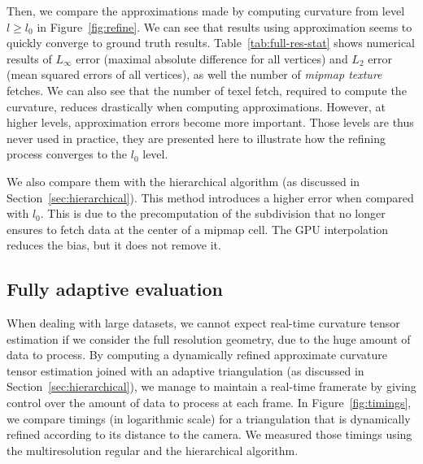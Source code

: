 \documentclass{llncs}
\begin{document}
Then, we compare the approximations made by computing curvature from
level $l \ge l_0$ in Figure~\ref{fig:refine}. We can see that results
using approximation seems to quickly converge to ground truth results.
Table~\ref{tab:full-res-stat} shows numerical results of $L_\infty$
error (maximal absolute difference for all vertices) and $L_2$ error
(mean squared errors of all vertices), as well the number of
\emph{mipmap texture} fetches. We can also see that the number of
texel fetch, required to compute the curvature, reduces drastically
when computing approximations. However, at higher levels,
approximation errors become more important. Those levels are thus
never used in practice, they are presented here to illustrate how the
refining process converges to the $l_0$ level.

We also compare them with the hierarchical algorithm (as discussed in
Section~\ref{sec:hierarchical}). This method introduces a higher error when compared with
$l_0$. This is due to the precomputation of the subdivision that no longer
ensures to fetch data at the center of a mipmap cell.
The GPU interpolation reduces the bias, but it does not remove it.



\subsection{Fully adaptive evaluation}

When dealing with large datasets, we cannot expect real-time curvature tensor
estimation if we consider the full resolution geometry, due to the huge amount of data to process. By computing a
dynamically refined approximate curvature tensor estimation joined with an
adaptive triangulation (as discussed in Section~\ref{sec:hierarchical}), we
manage to maintain a real-time framerate by giving control over the amount of
data to process at each frame. In Figure~\ref{fig:timings}, we compare timings
(in logarithmic scale) for a triangulation that is dynamically refined according
to its distance to the camera. We measured those timings using the multiresolution regular and
the hierarchical algorithm.
\end{document}
